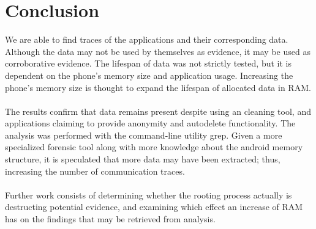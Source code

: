 \section{Conclusion}
We are able to find traces of the applications and their corresponding data. Although the data may not be used by themselves as evidence, it may be used as corroborative evidence. The lifespan of data was not strictly tested, but it is dependent on the phone's memory size and application usage. Increasing the phone's memory size is thought to expand the lifespan of allocated data in RAM.\\\\
The results confirm that data remains present despite using an cleaning tool, and applications claiming to provide anonymity and autodelete functionality. The analysis was performed with the command-line utility grep. Given a more specialized forensic tool along with more knowledge about the android memory structure, it is speculated that more data may have been extracted; thus, increasing the number of communication traces.\\\\
Further work consists of determining whether the rooting process actually is destructing potential evidence, and examining which effect an increase of RAM has on the findings that may be retrieved from analysis.